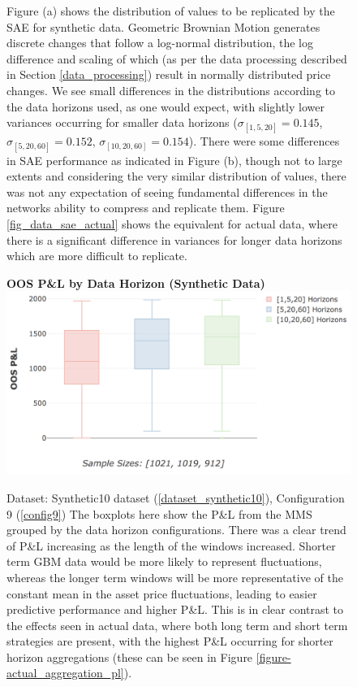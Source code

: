 \documentclass[a4paper,11pt,oneside]{article}
\theoremstyle{plain}
\theoremstyle{definition}
\begin{document}
\begin{figure}[H]
{			\newline Figure (a) shows the distribution of values to be replicated by the SAE for synthetic data. Geometric Brownian Motion generates discrete changes that follow a log-normal distribution, the log difference and scaling of which (as per the data processing described in Section \ref{data_processing}) result in normally distributed price changes. We see small differences in the distributions according to the data horizons used, as one would expect, with slightly lower variances occurring for smaller data horizons ($\sigma_{[1,5,20]} = 0.145$, $\sigma_{[5,20,60]} = 0.152$, $\sigma_{[10,20,60]} = 0.154$). There were some differences in SAE performance as indicated in Figure (b), though not to large extents and considering the very similar distribution of values, there was not any expectation of seeing fundamental differences in the networks ability to compress and replicate them. 
			\newline Figure \ref{fig_data_sae_actual} shows the equivalent for actual data, where there is a significant difference in variances for longer data horizons which are more difficult to replicate.}
		\label{figure-data_sae_synthetic}
	\end{figure}
	
	
	
	\begin{figure}[H]
		\centering 
		\textbf{OOS P\&L by Data Horizon (Synthetic Data)}
		\includegraphics[scale=0.36]{images/results/8_5_synthetic_data/test_aggregation_pl.png}
		\caption[OOS P\&L by Data Aggregation for Synthetic Data]{
			Dataset: Synthetic10 dataset (\ref{dataset_synthetic10}), Configuration 9 (\ref{config9})
			\newline  The boxplots here show the P\&L from the MMS grouped by the data horizon configurations. There was a clear trend of P\&L increasing as the length of the windows increased. Shorter term GBM data would be more likely to represent fluctuations, whereas the longer term windows will be more representative of the constant mean in the asset price fluctuations, leading to easier predictive performance and higher P\&L. This is in clear contrast to the effects seen in actual data, where both long term and short term strategies are present, with the highest P\&L occurring for shorter horizon aggregations (these can be seen in Figure \ref{figure-actual_aggregation_pl}).}
		\label{figure-test_aggregation_pl}
	\end{figure}
	
\end{document}
